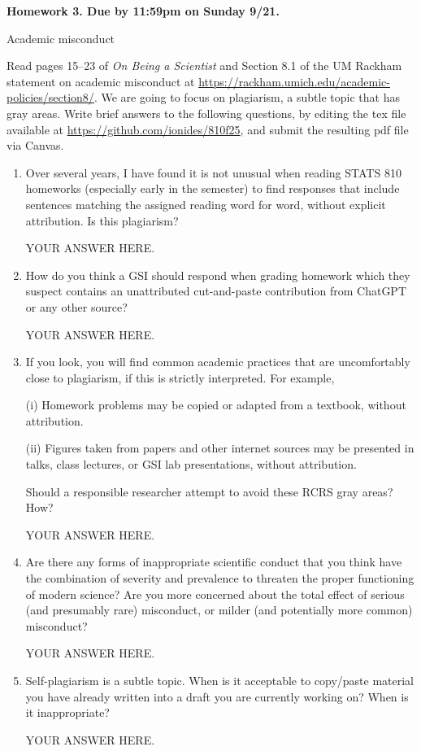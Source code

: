 \documentclass[12pt]{article}
\begin{document}
\begin{center}\bf
Homework 3. Due by 11:59pm on Sunday 9/21.

Academic misconduct

\end{center}
Read pages 15--23 of {\em On Being a Scientist} and Section 8.1 of the UM Rackham statement on academic misconduct at \url{https://rackham.umich.edu/academic-policies/section8/}. We are going to focus on plagiarism, a subtle topic that has gray areas. Write brief answers to the following questions, by editing the tex file available at \url{https://github.com/ionides/810f25}, and submit the resulting pdf file via Canvas. 

\begin{enumerate}

\item Over several years, I have found it is not unusual when reading STATS 810 homeworks (especially early in the semester) to find responses that include sentences matching the assigned reading word for word, without explicit attribution. Is this plagiarism?

YOUR ANSWER HERE.

\item How do you think a GSI should respond when grading homework which they suspect contains an unattributed cut-and-paste contribution from ChatGPT or any other source?

YOUR ANSWER HERE.

\item If you look, you will find common academic practices that are uncomfortably close to plagiarism, if this is strictly interpreted. For example,

(i) Homework problems may be copied or adapted from a textbook, without attribution.

(ii) Figures taken from papers and other internet sources may be presented in talks, class lectures, or GSI lab presentations, without attribution.

Should a responsible researcher attempt to avoid these RCRS gray areas? How?
  
YOUR ANSWER HERE.

\item Are there any forms of inappropriate scientific conduct that you think have the combination of severity and prevalence to threaten the proper functioning of modern science? Are you more concerned about the total effect of serious (and presumably rare) misconduct, or milder (and potentially more common) misconduct?

YOUR ANSWER HERE.

\item Self-plagiarism is a subtle topic. When is it acceptable to copy/paste material you have already written into a draft you are currently working on? When is it inappropriate?

YOUR ANSWER HERE.

\end{enumerate}
\end{document}
